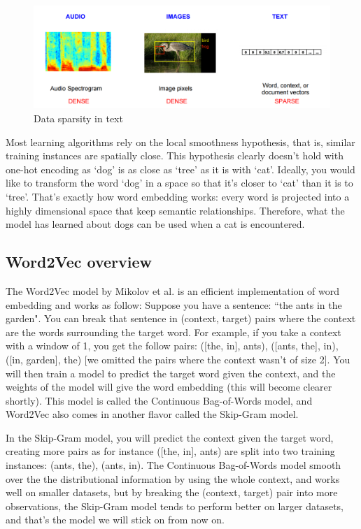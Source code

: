 \begin{figure}[H]
    \centering
    \includegraphics[width=\textwidth]{Images/comparison-text.png}
    \caption{Data sparsity in text \cite{comparison-text}}
    \label{comparison-text}
\end{figure}

Most learning algorithms rely on the local smoothness hypothesis, that is, similar training instances are spatially close. This hypothesis clearly doesn't hold with one-hot encoding as `dog' is as close as `tree' as it is with `cat'. Ideally, you would like to transform the word `dog' in a space so that it's closer to `cat' than it is to `tree'. That's exactly how word embedding works: every word is projected into a highly dimensional space that keep semantic relationships. Therefore, what the model has learned about dogs can be used when a cat is encountered. 

\subsection{Word2Vec overview}
The Word2Vec model by Mikolov et al. \cite{word2vec} is an efficient implementation of word embedding and works as follow:
Suppose you have a sentence: ``the ants in the garden". You can break that sentence in (context, target) pairs where the context are the words surrounding the target word. For example, if you take a context with a window of 1, you get the follow pairs: ([the, in], ants), ([ants, the], in), ([in, garden], the) [we omitted the pairs where the context wasn't of size 2]. You will then train a model to predict the target word given the context, and the weights of the model will give the word embedding (this will become clearer shortly). This model is called the Continuous Bag-of-Words model, and Word2Vec also comes in another flavor called the Skip-Gram model.

In the Skip-Gram model, you will predict the context given the target word, creating more pairs as for instance ([the, in], ants) are split into two training instances: (ants, the), (ants, in). The Continuous Bag-of-Words model smooth over the the distributional information by using the whole context, and works well on smaller datasets, but by breaking the (context, target) pair into more observations, the Skip-Gram model tends to perform better on larger datasets, and that's the model we will stick on from now on.

